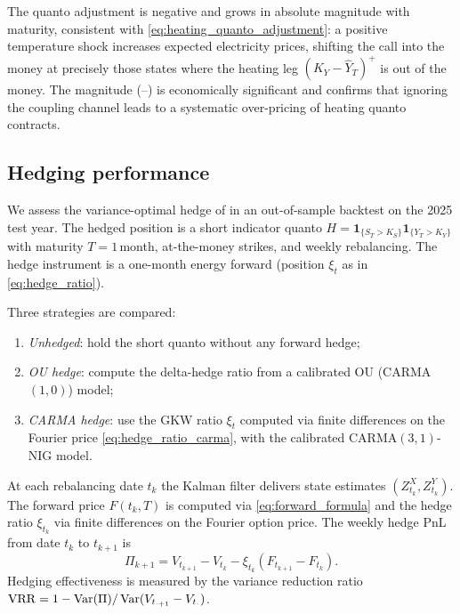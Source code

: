 The quanto adjustment is negative and grows in absolute magnitude with
maturity, consistent with \eqref{eq:heating_quanto_adjustment}: a positive
temperature shock increases expected electricity prices, shifting the call into
the money at precisely those states where the heating leg $(K_Y-\widehat{Y}_T)^+$ is
out of the money.
The magnitude (--) is economically significant and confirms
that ignoring the coupling channel leads to a systematic over-pricing of
heating quanto contracts.

\subsection{Hedging performance}\label{ssec:hedging}

We assess the variance-optimal hedge of  in an
out-of-sample backtest on the 2025 test year.
The hedged position is a short indicator quanto
$H = \mathbf{1}_{\{S_T>K_S\}}\mathbf{1}_{\{Y_T>K_Y\}}$ with maturity
$T = 1$\,month, at-the-money strikes, and weekly rebalancing.
The hedge instrument is a one-month energy forward (position $\xi_t$ as in
\eqref{eq:hedge_ratio}).

Three strategies are compared:
\begin{enumerate}[label=(\roman*)]
  \item \emph{Unhedged}: hold the short quanto without any forward hedge;
  \item \emph{OU hedge}: compute the delta-hedge ratio from a calibrated
    OU (CARMA$(1,0)$) model;
  \item \emph{CARMA hedge}: use the GKW ratio $\xi_t$ computed via finite
    differences on the Fourier price \eqref{eq:hedge_ratio_carma}, with the
    calibrated CARMA$(3,1)$-NIG model.
\end{enumerate}

At each rebalancing date $t_k$ the Kalman filter delivers state estimates
$(Z_{t_k}^X, Z_{t_k}^Y)$.
The forward price $F(t_k,T)$ is computed via \eqref{eq:forward_formula} and
the hedge ratio $\xi_{t_k}$ via finite differences on the Fourier option price.
The weekly hedge PnL from date $t_k$ to $t_{k+1}$ is
$$
  \Pi_{k+1}
  = V_{t_{k+1}} - V_{t_k} - \xi_{t_k}(F_{t_{k+1}} - F_{t_k}).
$$
Hedging effectiveness is measured by the variance reduction ratio
$\mathrm{VRR} = 1 - \operatorname{Var}(\Pi)/\operatorname{Var}(V_{t_{\cdot+1}}-V_{t_\cdot})$.

